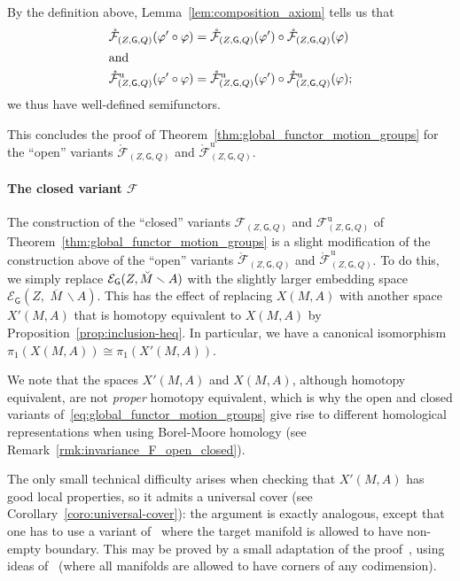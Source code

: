 \documentclass[AHL,Unicode,published]{cedram}
\newcommand{\Int}{\mathring}
\newcommand{\unt}{\mathrm{u}}
\newcommand{\mbar}{\ensuremath{{\,\,\overline{\!\! M\!}\,}}}
\newcommand{\sG}{\mathsf{G}}
\newcommand{\cE}{\mathcal{E}}
\newcommand{\cF}{\mathcal{F}}
\begin{document}
By the definition above, Lemma~\ref{lem:composition_axiom} tells us that
\begin{align*}
\Int{\cF}_{(Z,\sG,Q)}(\varphi'\circ\varphi) &=\Int{\cF}_{(Z,\sG,Q)}(\varphi')\circ \Int{\cF}_{(Z,\sG,Q)}(\varphi)\\
\intertext{and}
\Int{\cF}^{\unt}_{(Z,\sG,Q)}(\varphi'\circ\varphi) &=\Int{\cF}^{\unt}_{(Z,\sG,Q)}(\varphi')\circ\Int{\cF}^{\unt}_{(Z,\sG,Q)}(\varphi);
\end{align*}
we thus have well-defined semifunctors.

This concludes the proof of Theorem~\ref{thm:global_functor_motion_groups} for the ``open'' variants $\Int{\cF}_{(Z,\sG,Q)}$ and $\Int{\cF}^{\unt}_{(Z,\sG,Q)}$.


\paragraph*{The closed variant $\cF$}
The construction of the ``closed'' variants $\cF_{(Z,\sG,Q)}$ and $\cF^{\unt}_{(Z,\sG,Q)}$ of Theorem~\ref{thm:global_functor_motion_groups} is a slight modification of the construction above of the ``open'' variants $\Int{\cF}_{(Z,\sG,Q)}$ and $\Int{\cF}^{\unt}_{(Z,\sG,Q)}$. To do this, we simply replace $\cE_{\sG}(Z,\Breve{M} \smallsetminus A)$ with the slightly larger embedding space $\cE_{\sG}(Z,\mbar \smallsetminus A)$. This has the effect of replacing $X(M,A)$ with another space $X'(M,A)$ that is homotopy equivalent to $X(M,A)$ by Proposition~\ref{prop:inclusion-heq}. In particular, we have a canonical isomorphism $\pi_{1}(X(M,A)) \cong \pi_{1}(X'(M,A))$.

\begin{rema}\label{rmk:not-proper-homotopy-equivalence}
We note that the spaces $X'(M,A)$ and $X(M,A)$, although homotopy equivalent, are not \emph{proper} homotopy equivalent, which is why the open and closed variants of~\eqref{eq:global_functor_motion_groups} give rise to different homological representations when using Borel-Moore homology (see Remark~\ref{rmk:invariance_F_open_closed}).
\end{rema}

The only small technical difficulty arises when checking that $X'(M,A)$ has good local properties, so it admits a universal cover (see Corollary~\ref{coro:universal-cover}): the argument is exactly analogous, except that one has to use a variant of~\cite[Prop.~4.15]{Palmer2018HomologicalstabilitymoduliI} where the target manifold is allowed to have non-empty boundary. This may be proved by a small adaptation of the proof~\cite[Prop.~4.15]{Palmer2018HomologicalstabilitymoduliI}, using ideas of~\cite{Cerf1961Topologiedecertains} (where all manifolds are allowed to have corners of any codimension).
\end{document}
